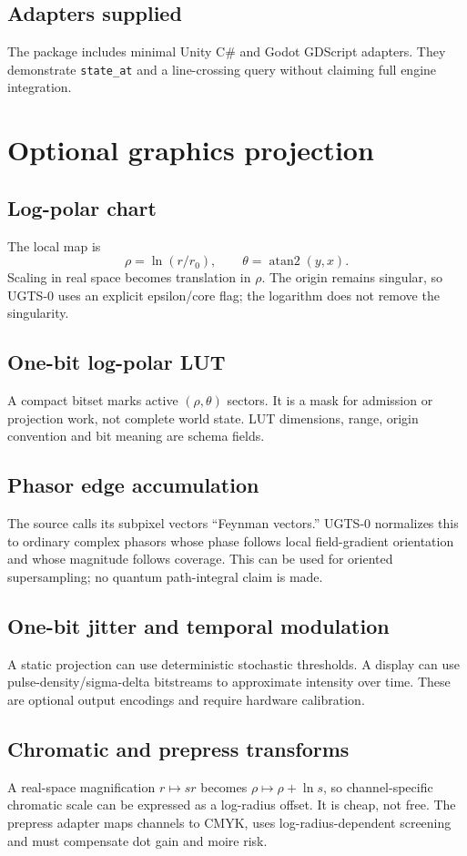 \documentclass[10.5pt,a4paper,openany]{book}
\newcommand{\statusretain}{\tcbox[on line,boxsep=1pt,left=3pt,right=3pt,top=1pt,bottom=1pt,arc=2pt,colback=UGTSTeal,colframe=UGTSTeal,coltext=white,fontupper=\sffamily\bfseries\scriptsize]{RETAIN}}
\newcommand{\statustranslate}{\tcbox[on line,boxsep=1pt,left=3pt,right=3pt,top=1pt,bottom=1pt,arc=2pt,colback=UGTSGold,colframe=UGTSGold,coltext=UGTSNavy,fontupper=\sffamily\bfseries\scriptsize]{TRANSLATE}}
\newcommand{\code}[1]{\texttt{#1}}
\begin{document}
\section{Adapters supplied}
The package includes minimal Unity C\# and Godot GDScript adapters. They demonstrate \code{state\_at} and a line-crossing query without claiming full engine integration.

\chapter{Optional graphics projection}
\section{Log-polar chart}
\statusretain\quad The local map is
\[
\rho=\ln(r/r_0),\qquad\theta=\operatorname{atan2}(y,x).
\]
Scaling in real space becomes translation in $\rho$. The origin remains singular, so UGTS-0 uses an explicit epsilon/core flag; the logarithm does not remove the singularity.

\section{One-bit log-polar LUT}
A compact bitset marks active $(\rho,\theta)$ sectors. It is a mask for admission or projection work, not complete world state. LUT dimensions, range, origin convention and bit meaning are schema fields.

\section{Phasor edge accumulation}
\statustranslate\quad The source calls its subpixel vectors ``Feynman vectors.'' UGTS-0 normalizes this to ordinary complex phasors whose phase follows local field-gradient orientation and whose magnitude follows coverage. This can be used for oriented supersampling; no quantum path-integral claim is made.

\section{One-bit jitter and temporal modulation}
\statusretain\quad A static projection can use deterministic stochastic thresholds. \statustranslate\quad A display can use pulse-density/sigma-delta bitstreams to approximate intensity over time. These are optional output encodings and require hardware calibration.

\section{Chromatic and prepress transforms}
A real-space magnification $r\mapsto sr$ becomes $\rho\mapsto\rho+\ln s$, so channel-specific chromatic scale can be expressed as a log-radius offset. It is cheap, not free. The prepress adapter maps channels to CMYK, uses log-radius-dependent screening and must compensate dot gain and moire risk.
\end{document}
